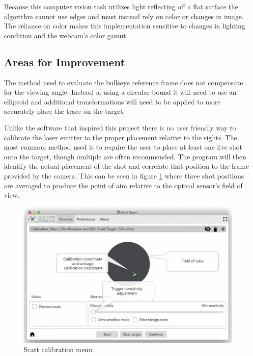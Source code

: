 \documentclass[conference]{IEEEtran}
\begin{document}
Because this computer vision task utilizes light reflecting off a flat surface the algorithm cannot use edges and must instead rely on color or changes in image.
The reliance on color makes this implementation sensitive to changes in lighting condition and the webcam's color gamut.

\subsection{Areas for Improvement}

The method used to evaluate the bullseye reference frame does not compensate for the viewing angle. Instead of using a circular-bound it will need to use an ellipsoid and additional transformations will need to be applied to more accurately place the trace on the target.

Unlike the software that inspired this project there is no user friendly way to calibrate the laser emitter to the proper placement relative to the sights.
The most common method used is to require the user to place at least one live shot onto the target, though multiple are often recommended.
The program will then identify the actual placement of the shot and correlate that position to the frame provided by the camera.
This can be seen in figure \ref{fig:scatt_calibration} where three shot positions are averaged to produce the point of aim relative to the optical sensor's field of view.

\begin{figure}[]
	\centering
	\includegraphics[width=\linewidth]{scatt_calibration}
	\caption{Scatt \cite{scatt} calibration menu.}
	\label{fig:scatt_calibration}
\end{figure}
\end{document}
